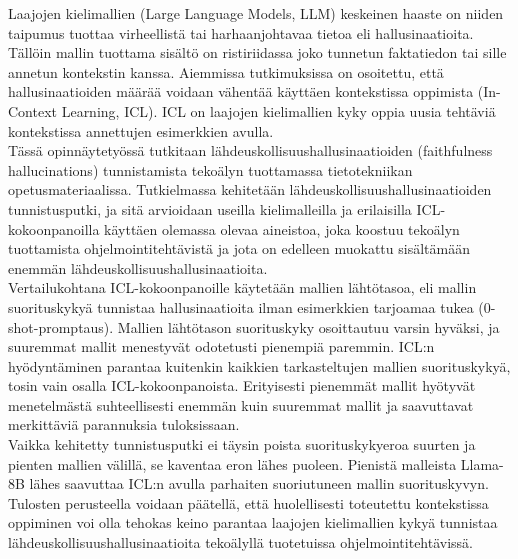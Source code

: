 \documentclass[english, 12pt, a4paper, sci, utf8, a-2b, online]{latex/definitions/aaltothesis}
\begin{document}
\clearpage


\begin{abstractpage}[finnish]
Laajojen kielimallien (Large Language Models, LLM) keskeinen haaste on niiden taipumus tuottaa virheellistä tai harhaanjohtavaa tietoa eli hallusinaatioita. Tällöin mallin tuottama sisältö on ristiriidassa joko tunnetun faktatiedon tai sille annetun kontekstin kanssa. Aiemmissa tutkimuksissa on osoitettu, että hallusinaatioiden määrää voidaan vähentää käyttäen kontekstissa oppimista (In-Context Learning, ICL). ICL on laajojen kielimallien kyky oppia uusia tehtäviä kontekstissa annettujen esimerkkien avulla. \\

\noindent
Tässä opinnäytetyössä tutkitaan lähdeuskollisuushallusinaatioiden (faithfulness hallucinations) tunnistamista tekoälyn tuottamassa tietotekniikan opetusmateriaalissa. Tutkielmassa kehitetään lähdeuskollisuushallusinaatioiden tunnistusputki, ja sitä arvioidaan useilla kielimalleilla ja erilaisilla ICL-kokoonpanoilla käyttäen olemassa olevaa aineistoa, joka koostuu tekoälyn tuottamista ohjelmointitehtävistä ja jota on edelleen muokattu sisältämään enemmän lähdeuskollisuushallusinaatioita. \\

\noindent
Vertailukohtana ICL-kokoonpanoille käytetään mallien lähtötasoa, eli mallin suorituskykyä tunnistaa hallusinaatioita ilman esimerkkien tarjoamaa tukea (0-shot-promptaus). Mallien lähtötason suorituskyky osoittautuu varsin hyväksi, ja suuremmat mallit menestyvät odotetusti pienempiä paremmin. ICL:n hyödyntäminen parantaa kuitenkin kaikkien tarkasteltujen mallien suorituskykyä, tosin vain osalla ICL-kokoonpanoista. Erityisesti pienemmät mallit hyötyvät menetelmästä suhteellisesti enemmän kuin suuremmat mallit ja saavuttavat merkittäviä parannuksia tuloksissaan. \\

\noindent
Vaikka kehitetty tunnistusputki ei täysin poista suorituskykyeroa suurten ja pienten mallien välillä, se kaventaa eron lähes puoleen. Pienistä malleista Llama-8B lähes saavuttaa ICL:n avulla parhaiten suoriutuneen mallin suorituskyvyn. Tulosten perusteella voidaan päätellä, että huolellisesti toteutettu kontekstissa oppiminen voi olla tehokas keino parantaa laajojen kielimallien kykyä tunnistaa lähdeuskollisuushallusinaatioita tekoälyllä tuotetuissa ohjelmointitehtävissä.
\end{abstractpage}
\end{document}
